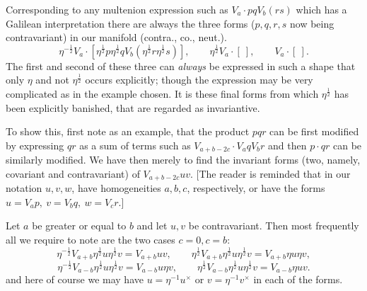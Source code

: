 \documentclass[11pt]{article}
\begin{document}
Corresponding to any multenion expression such as $V_a\cdot pqV_b(rs)$ which has a Galilean interpretation there are always the three forms ($p,q,r,s$ now being contravariant) in our manifold (contra., co., neut.).
\[
\eta^{-\frac12}V_a\cdot[\eta^{\frac12}p\eta^{\frac12}qV_b(\eta^{\frac12}r\eta^{\frac12}s)],\qquad \eta^{\frac12}V_a\cdot[\ ],\qquad V_a\cdot[\ ].
\]
The first and second of these three can \emph{always} be expressed in such a shape that only $\eta$ and not $\eta^{\frac12}$ occurs explicitly; though the expression may be very complicated as in the example chosen. It is these final forms from which $\eta^{\frac12}$ has been explicitly banished, that are regarded as invariantive.

\indent To show this, first note as an example, that the product $pqr$ can be first modified by expressing $qr$ as a sum of terms such as $V_{a+b-2c}\cdot V_aqV_br$ and then $p\cdot qr$ can be similarly modified. We have then merely to find the invariant forms (two, namely, covariant and contravariant) of $V_{a+b-2c}uv$. [The reader is reminded that in our notation $u,v,w$, have homogeneities $a,b,c$, respectively, or have the forms $u=V_ap,\ v=V_bq,\ w=V_cr$.]

\indent Let $a$ be greater or equal to $b$ and let $u,v$ be contravariant. Then most frequently all we require to note are the two cases $c=0,c=b$:
\[
\eta^{-\frac12}V_{a+b}\eta^{\frac12}u\eta^{\frac12}v=V_{a+b}uv,\qquad \eta^{\frac12}V_{a+b}\eta^{\frac12}u\eta^{\frac12}v=V_{a+b}\eta u\eta v,
\]
\[
\eta^{-\frac12}V_{a-b}\eta^{\frac12}u\eta^{\frac12}v=V_{a-b}u\eta v,\qquad \eta^{\frac12}V_{a-b}\eta^{\frac12}u\eta^{\frac12}v=V_{a-b}\eta u v.
\]
and here of course we may have $u=\eta^{-1}u^\times$ or $v=\eta^{-1}v^\times$ in each of the forms.
\end{document}
